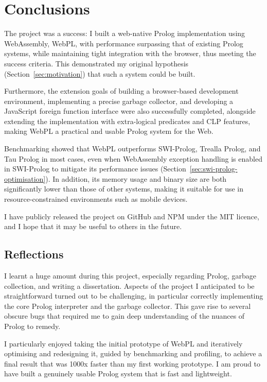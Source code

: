 \chapter{Conclusions}

The project was a success: I built a web-native Prolog implementation using WebAssembly, WebPL, with performance surpassing that of existing Prolog systems, while maintaining tight integration with the browser, thus meeting the success criteria. This demonstrated my original hypothesis (Section~\ref{sec:motivation}) that such a system could be built.

Furthermore, the extension goals of building a browser-based development environment, implementing a precise garbage collector, and developing a JavaScript foreign function interface were also successfully completed, alongside extending the implementation with extra-logical predicates and CLP features, making WebPL a practical and usable Prolog system for the Web.

Benchmarking showed that WebPL outperforms SWI-Prolog, Trealla Prolog, and Tau Prolog in most cases, even when WebAssembly exception handling is enabled in SWI-Prolog to mitigate its performance issues (Section~\ref{sec:swi-prolog-optimisation}). In addition, its memory usage and binary size are both significantly lower than those of other systems, making it suitable for use in resource-constrained environments such as mobile devices.

I have publicly released the project on GitHub and NPM under the MIT licence, and I hope that it may be useful to others in the future.

\section{Reflections}

I learnt a huge amount during this project, especially regarding Prolog, garbage collection, and writing a dissertation. Aspects of the project I anticipated to be straightforward turned out to be challenging, in particular correctly implementing the core Prolog interpreter and the garbage collector. This gave rise to several obscure bugs that required me to gain deep understanding of the nuances of Prolog to remedy.

I particularly enjoyed taking the initial prototype of WebPL and iteratively optimising and redesigning it, guided by benchmarking and profiling, to achieve a final result that was 1000x faster than my first working prototype. I am proud to have built a genuinely usable Prolog system that is fast and lightweight.

